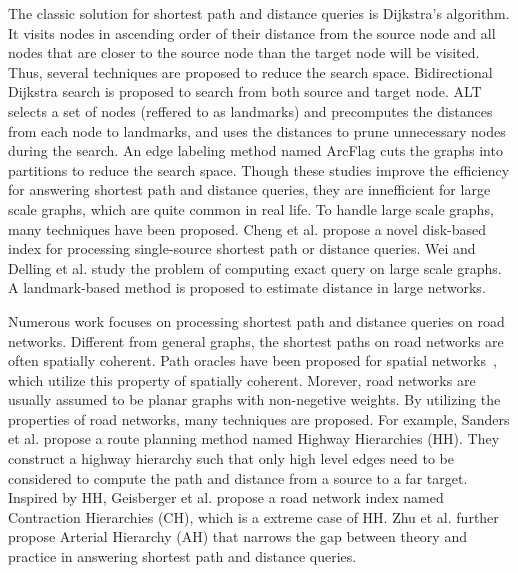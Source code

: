 The classic solution for shortest path and distance queries is Dijkstra's algorithm\cite{Dijkstra59}. It visits nodes in ascending order of their distance from the source node and all nodes that are closer to the source node than the target node will be visited. Thus, several techniques are proposed to reduce the search space\cite{LubyR89, GoldbergH05}. Bidirectional Dijkstra search\cite{LubyR89} is proposed to search from both source and target node. ALT\cite{GoldbergH05} selects a set of nodes (reffered to as landmarks) and precomputes the distances from each node to landmarks, and uses the distances to prune unnecessary nodes during the search. An edge labeling method named ArcFlag \cite{MohringSSWW05} cuts the graphs into partitions to reduce the search space. Though these studies improve the efficiency for answering shortest path and distance queries, they are innefficient for large scale graphs, which are quite common in real life. To handle large scale graphs, many techniques have been proposed\cite{ChengKCC12, delling2014robust, PotamiasBCG09, Wei10}. Cheng et al. \cite{ChengKCC12} propose a novel disk-based index for processing single-source shortest path or distance queries. Wei \cite{Wei10} and Delling et al.\cite{delling2014robust} study the problem of computing exact query on large scale graphs. A landmark-based method\cite{PotamiasBCG09} is proposed to estimate distance in large networks.

Numerous work focuses on processing shortest path and distance queries on road networks. Different from general graphs, the shortest paths on road networks are often spatially coherent. Path oracles have been proposed for spatial networks~\cite{SankaranarayananSA09}, which utilize this property of spatially coherent. Morever, road networks are usually assumed to be planar graphs with non-negetive weights\cite{fakcharoenphol2006planar,gupta2004roads,klein2010shortest,MozesS12}. By utilizing the properties of road networks, many techniques\cite{SandersS05, GeisbergerSSD08, zhu2013shortest} are proposed. For example, Sanders et al. propose a route planning method named Highway Hierarchies (HH)\cite{SandersS05}. They construct a highway hierarchy such that only high level edges need to be considered to compute the path and distance from a source to a far target. Inspired by HH, Geisberger et al.\cite{GeisbergerSSD08} propose a road network index named Contraction Hierarchies (CH), which is a extreme case of HH. Zhu et al. further propose Arterial Hierarchy (AH)\cite{zhu2013shortest} that narrows the gap between theory and practice in answering shortest path and distance queries.

